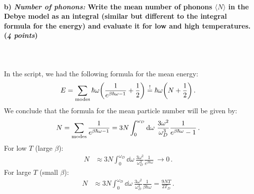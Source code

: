 \paragraph{b) \textit{Number of phonons:} Write the mean number of phonons 
    $\langle N\rangle$ in the Debye model as an integral (similar but 
    different to the integral formula for the energy) and evaluate it for low 
    and high temperatures. (\textit{4 points})
} \ \\
    \\
    In the script, we had the following formula for the mean energy:
    \begin{align}
        E
        =\sum_\textnormal{modes}\hbar\omega
        \bigg(\frac{1}{e^{\beta\hbar\omega-1}}+\frac{1}{2}\bigg)
        \overset{!}{=}\hbar\omega
        \bigg(N+\frac{1}{2}\bigg) \,.
    \end{align}
    We conclude that the formula for the mean particle number will be given by:
    \begin{align}
        N
        =\sum_\textnormal{modes}
        \frac{1}{e^{\beta\hbar\omega-1}}
        = 3N\int_0^{\omega_D} \dd\omega \ \frac{3\omega^2}{\omega_D^3}\frac{1}{e^{\beta\hbar\omega}-1} \,.
    \end{align}  %
    For low $T$ (large $\beta$):
    \begin{align}
        N
        &\approx 3N\int_0^{\omega_D} \dd\omega \ \frac{3\omega^2}{\omega_D^3}\frac{1}{e^{\beta\hbar\omega}} \ \longrightarrow 0 \,.
    \end{align}
    For large $T$ (small $\beta$):
    \begin{align}
        N
        &\approx 3N\int_0^{\omega_D} \dd\omega \ \frac{3\omega^2}{\omega_D^3}\frac{1}{\beta\hbar\omega} = \frac{9NT}{2T_D} \,.
    \end{align}
